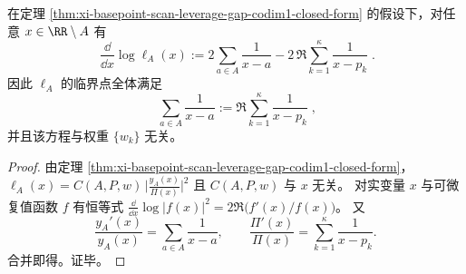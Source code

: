 \begin{corollary}\label{cor:xi-basepoint-scan-leverage-gap-codim1-critical-points}
在定理 \ref{thm:xi-basepoint-scan-leverage-gap-codim1-closed-form} 的假设下，对任意 \(x\in\RR\setminus A\) 有
\[
\boxed{\;
\frac{\dd}{\dd x}\log \ell_A(x)
:=
2\sum_{a\in A}\frac{1}{x-a}
-2\,\Re\sum_{k=1}^{\kappa}\frac{1}{x-p_k}\; }.
\]
因此 \(\ell_A\) 的临界点全体满足
\[
\boxed{\;
\sum_{a\in A}\frac{1}{x-a}
:=
\Re\sum_{k=1}^{\kappa}\frac{1}{x-p_k}\; },
\]
并且该方程与权重 \(\{w_k\}\) 无关。
\end{corollary}
\begin{proof}
由定理 \ref{thm:xi-basepoint-scan-leverage-gap-codim1-closed-form}，
\(
\ell_A(x)=C(A,P,w)\,\bigl|\frac{y_A(x)}{\Pi(x)}\bigr|^2
\)
且 \(C(A,P,w)\) 与 \(x\) 无关。
对实变量 \(x\) 与可微复值函数 \(f\) 有恒等式
\(
\frac{\dd}{\dd x}\log|f(x)|^2=2\Re\bigl(f'(x)/f(x)\bigr)
\)。
又
\[
\frac{y_A'(x)}{y_A(x)}=\sum_{a\in A}\frac{1}{x-a},
\qquad
\frac{\Pi'(x)}{\Pi(x)}=\sum_{k=1}^{\kappa}\frac{1}{x-p_k}.
\]
合并即得。证毕。
\end{proof}

